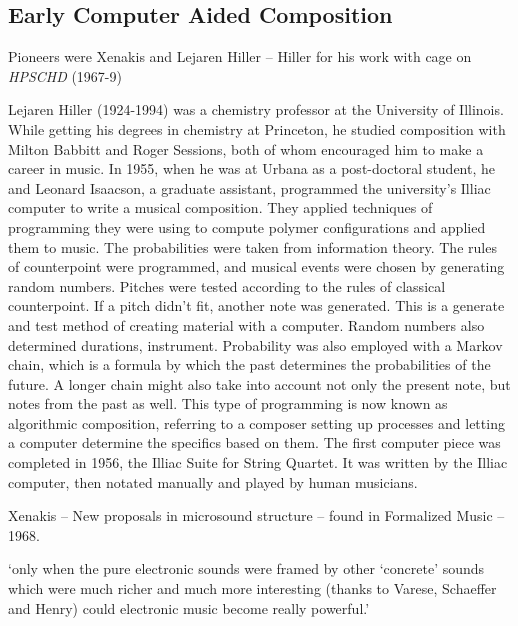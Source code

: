 \subsection{Early Computer Aided Composition} 
Pioneers were Xenakis and Lejaren Hiller – Hiller for his work with cage on \textit{HPSCHD} (1967-9)

Lejaren Hiller (1924-1994) was a chemistry professor at the University of Illinois. While getting his degrees in chemistry at Princeton, he studied composition with Milton Babbitt and Roger Sessions, both of whom encouraged him to make a career in music. In 1955, when he was at Urbana as a post-doctoral student, he and Leonard Isaacson, a graduate assistant, programmed the university's Illiac computer to write a musical composition. They applied techniques of programming they were using to compute polymer configurations and applied them to music. The probabilities were taken from information theory. The rules of counterpoint were programmed, and musical events were chosen by generating random numbers. Pitches were tested according to the rules of classical counterpoint. If a pitch didn't fit, another note was generated. This is a generate and test method of creating material with a computer. Random numbers also determined durations, instrument. Probability was also employed with a Markov chain, which is a formula by which the past determines the probabilities of the future. A longer chain might also take into account not only the present note, but notes from the past as well. This type of programming is now known as algorithmic composition, referring to a composer setting up processes and letting a computer determine the specifics based on them. The first computer piece was completed in 1956, the Illiac Suite for String Quartet. It was written by the Illiac computer, then notated manually and played by human musicians.

Xenakis – New proposals in microsound structure – found in Formalized Music – 1968.

`only when the pure electronic sounds were framed by other `concrete' sounds which were much richer and much more interesting (thanks to Varese, Schaeffer and Henry) could electronic music become really powerful.'


